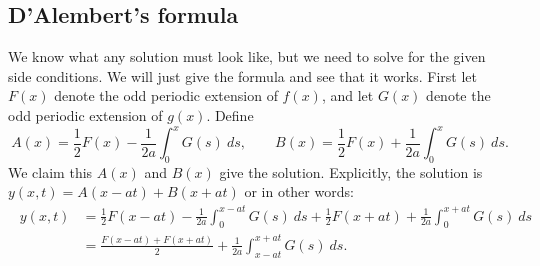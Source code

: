 \documentclass[12pt]{book}
\begin{document}
\subsection{D'Alembert's formula}

We know what any solution must look like, but we need to solve for the
given side conditions.  We will just give the formula and see that it works.
First let $F(x)$
denote the odd periodic extension of $f(x)$, and let $G(x)$ denote the
odd periodic extension of $g(x)$.  Define
\begin{equation*}
A(x) = \frac{1}{2} F(x) - \frac{1}{2a} \int_0^x G(s) ~ds ,
\qquad
B(x) = \frac{1}{2} F(x) + \frac{1}{2a} \int_0^x G(s) ~ds .
\end{equation*}
We claim this $A(x)$ and $B(x)$ give the solution.  Explicitly, the
solution is $y(x,t) = A(x-at) + B(x+at)$ or in other words:
\begin{equation} \label{dalemb:form}
\boxed{~~
\begin{aligned}
y(x,t) & =
\frac{1}{2} F(x-at) - \frac{1}{2a} \int_0^{x-at} G(s) ~ds 
+
\frac{1}{2} F(x+at) + \frac{1}{2a} \int_0^{x+at} G(s) ~ds \\
& =
\frac{F(x-at) + F(x+at)}{2} + \frac{1}{2a} \int_{x-at}^{x+at} G(s) ~ds .
\end{aligned}
~~}
\end{equation}
\end{document}
